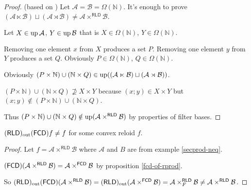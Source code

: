 \begin{proof}
(based on \cite{MO72638}) Let $\mathcal{A}=\mathcal{B}=\Omega(\mathbb{N})$.
It's enough to prove $(\mathcal{A}\ltimes\mathcal{B})\sqcup(\mathcal{A}\rtimes\mathcal{B})\neq\mathcal{A}\times^{\mathsf{RLD}}\mathcal{B}$.

Let $X\in\operatorname{up}\mathcal{A}$, $Y\in\operatorname{up}\mathcal{B}$ that is $X\in\Omega(\mathbb{N})$,
$Y\in\Omega(\mathbb{N})$.

Removing one element $x$ from $X$ produces a set $P$. Removing
one element $y$ from $Y$ produces a set $Q$. Obviously $P\in\Omega(\mathbb{N})$,
$Q\in\Omega(\mathbb{N})$.

Obviously $(P\times\mathbb{N})\cup(\mathbb{N}\times Q)\in\operatorname{up}((\mathcal{A}\ltimes\mathcal{B})\sqcup(\mathcal{A}\rtimes\mathcal{B}))$.

$(P\times\mathbb{N})\cup(\mathbb{N}\times Q)\nsupseteq X\times Y$
because $(x;y)\in X\times Y$ but $(x;y)\notin(P\times\mathbb{N})\cup(\mathbb{N}\times Q)$.

Thus $(P\times\mathbb{N})\cup(\mathbb{N}\times Q)\notin\operatorname{up}(\mathcal{A}\times^{\mathsf{RLD}}\mathcal{B})$
by properties of filter bases.\end{proof}
\begin{example}
$(\mathsf{RLD})_{\mathrm{out}}(\mathsf{FCD}) f\ne f$ for some convex reloid $f$.\end{example}
\begin{proof}
Let $f=\mathcal{A}\times^{\mathsf{RLD}}\mathcal{B}$ where $\mathcal{A}$
and $B$ are from example \ref{secprod-neq}.

$(\mathsf{FCD})(\mathcal{A}\times^{\mathsf{RLD}}\mathcal{B})=\mathcal{A}\times^{\mathsf{FCD}}\mathcal{B}$
by proposition \ref{fcd-of-rprod}.

So $(\mathsf{RLD})_{\mathrm{out}}(\mathsf{FCD})(\mathcal{A}\times^{\mathsf{RLD}}\mathcal{B})=(\mathsf{RLD})_{\mathrm{out}}(\mathcal{A}\times^{\mathsf{FCD}}\mathcal{B})=\mathcal{A}\times_{F}^{\mathsf{RLD}}\mathcal{B}\ne\mathcal{A}\times^{\mathsf{RLD}}\mathcal{B}$.\end{proof}

